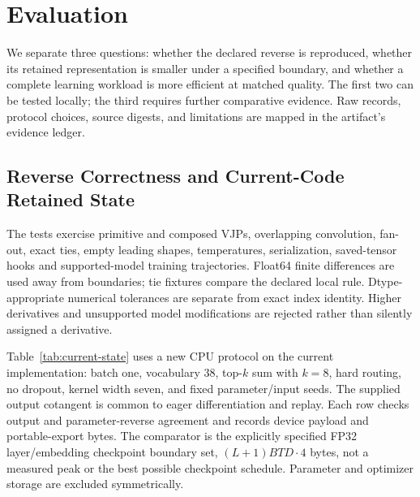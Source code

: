 \documentclass{article}
\theoremstyle{plain}
\theoremstyle{definition}
\theoremstyle{remark}
\begin{document}
\section{Evaluation}
\label{sec:evaluation}

We separate three questions: whether the declared reverse is reproduced,
whether its retained representation is smaller under a specified boundary,
and whether a complete learning workload is more efficient at matched
quality. The first two can be tested locally; the third requires further
comparative evidence. Raw records, protocol choices, source digests, and
limitations are mapped in the artifact's evidence ledger.

\subsection{Reverse Correctness and Current-Code Retained State}

The tests exercise primitive and composed VJPs, overlapping convolution,
fan-out, exact ties, empty leading shapes, temperatures, serialization,
saved-tensor hooks and supported-model training trajectories. Float64 finite
differences are used away from boundaries; tie fixtures compare the declared
local rule. Dtype-appropriate numerical tolerances are separate from exact
index identity. Higher derivatives and unsupported model modifications are
rejected rather than silently assigned a derivative.

Table~\ref{tab:current-state} uses a new CPU protocol on the current
implementation: batch one, vocabulary 38, top-$k$ sum with $k=8$, hard routing,
no dropout, kernel width seven, and fixed parameter/input seeds. The supplied output cotangent
is common to eager differentiation and replay. Each row checks output and
parameter-reverse agreement and records device payload and portable-export
bytes. The comparator is the explicitly specified FP32 layer/embedding
checkpoint boundary set, $(L+1)BTD\cdot4$ bytes, not a measured peak or the
best possible checkpoint schedule. Parameter and optimizer storage are
excluded symmetrically.

\begin{table}[t]
\centering
\caption{Current-code retained-state audit. Payload is actual device-tape
storage; portable includes export framing. ``Boundary B'' is the specified
layer/embedding checkpoint retained set; Ratio is Boundary B / Packed B.
Both use a common supplied-cotangent boundary, not
allocator peak or an optimal schedule. Ratios do not include recomputation,
traffic, transient workspace, loss construction or optimizer state.
Exact source and configuration fingerprints accompany every row.}
\label{tab:current-state}
\small

\end{table}
\end{document}
